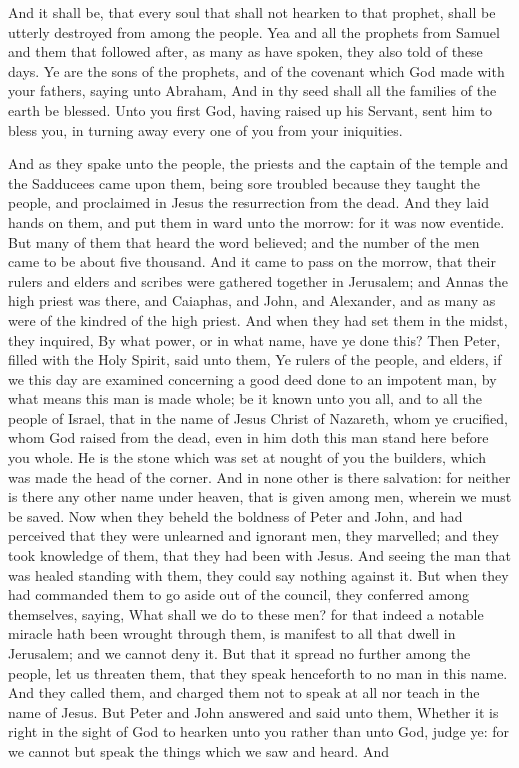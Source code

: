 And it shall be, that every soul that shall not hearken to that prophet, shall be utterly destroyed from among the people. Yea and all the prophets from Samuel and them that followed after, as many as have spoken, they also told of these days. Ye are the sons of the prophets, and of the covenant which God made with your fathers, saying unto Abraham, And in thy seed shall all the families of the earth be blessed. Unto you first God, having raised up his Servant, sent him to bless you, in turning away every one of you from your iniquities. 

And as they spake unto the people, the priests and the captain of the temple and the Sadducees came upon them, being sore troubled because they taught the people, and proclaimed in Jesus the resurrection from the dead. And they laid hands on them, and put them in ward unto the morrow: for it was now eventide. But many of them that heard the word believed; and the number of the men came to be about five thousand.  And it came to pass on the morrow, that their rulers and elders and scribes were gathered together in Jerusalem; and Annas the high priest was there, and Caiaphas, and John, and Alexander, and as many as were of the kindred of the high priest. And when they had set them in the midst, they inquired, By what power, or in what name, have ye done this? Then Peter, filled with the Holy Spirit, said unto them, Ye rulers of the people, and elders, if we this day are examined concerning a good deed done to an impotent man, by what means this man is made whole; be it known unto you all, and to all the people of Israel, that in the name of Jesus Christ of Nazareth, whom ye crucified, whom God raised from the dead, even in him doth this man stand here before you whole. He is the stone which was set at nought of you the builders, which was made the head of the corner. And in none other is there salvation: for neither is there any other name under heaven, that is given among men, wherein we must be saved.  Now when they beheld the boldness of Peter and John, and had perceived that they were unlearned and ignorant men, they marvelled; and they took knowledge of them, that they had been with Jesus. And seeing the man that was healed standing with them, they could say nothing against it. But when they had commanded them to go aside out of the council, they conferred among themselves, saying, What shall we do to these men? for that indeed a notable miracle hath been wrought through them, is manifest to all that dwell in Jerusalem; and we cannot deny it. But that it spread no further among the people, let us threaten them, that they speak henceforth to no man in this name. And they called them, and charged them not to speak at all nor teach in the name of Jesus. But Peter and John answered and said unto them, Whether it is right in the sight of God to hearken unto you rather than unto God, judge ye: for we cannot but speak the things which we saw and heard. And 